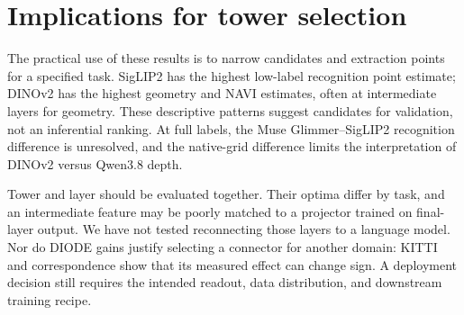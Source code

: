 \section{Implications for tower selection}
The practical use of these results is to narrow candidates and extraction points for a
specified task. SigLIP2 has the highest low-label recognition point estimate; DINOv2
has the highest geometry and NAVI estimates, often at intermediate layers for geometry.
These descriptive patterns suggest candidates for validation, not an inferential ranking.
At full labels, the Muse Glimmer--SigLIP2 recognition difference is unresolved, and the
native-grid difference limits the interpretation of DINOv2 versus Qwen3.8 depth.

Tower and layer should be evaluated together. Their optima differ by task, and an
intermediate feature may be poorly matched to a projector trained on final-layer output.
We have not tested reconnecting those layers to a language model. Nor do DIODE gains
justify selecting a connector for another domain: KITTI and correspondence show that
its measured effect can change sign. A deployment decision still requires the intended
readout, data distribution, and downstream training recipe.
